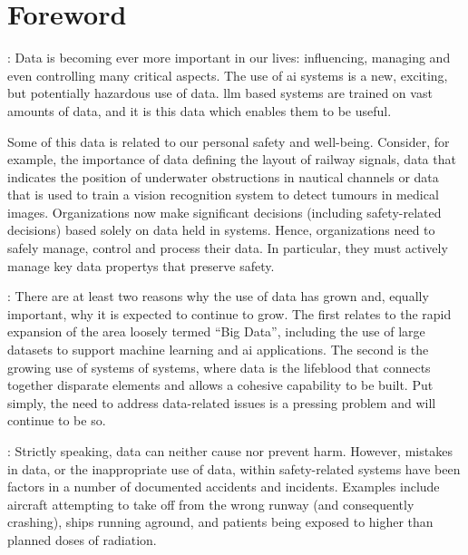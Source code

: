 \makeatletter		%
\dsiwg@intblankpage
\makeatother

\pagestyle{FirstPageFrontMatter}
\section*{Foreword}


:
Data is becoming ever more important in our lives: influencing, managing and even controlling many critical aspects.
The use of \gls{ai} systems is a new, exciting, but potentially hazardous use of data. \Gls{llm} based systems are trained on vast amounts of data, and it is this data which enables them to be useful.

Some of this data is related to our personal safety and well-being.
Consider, for example, the importance of data defining the layout of railway signals,
data that indicates the position of underwater obstructions in nautical channels or data that
is used to train a vision recognition system to detect tumours in medical images.
Organizations now make significant decisions (including safety-related decisions) based solely on data held in systems.
Hence, organizations need to safely manage, control and process their data.
In particular, they must actively manage key \glspl{data property} that preserve safety.

: There are at least two reasons why the use of data has grown and, equally important, why it is expected to continue to grow. The  first relates to the rapid expansion of the area loosely termed ``Big Data'', including the use of large \glspl{dataset} to support machine learning and \gls{ai} applications. The second is the growing use of systems of systems, where data is the lifeblood that connects together disparate elements and allows a cohesive capability to be built. Put simply, the need to address data-related issues is a pressing problem and will continue to be so.

: Strictly speaking,
data can neither cause nor prevent harm.
However, mistakes in data, or the inappropriate use of data, within safety-related systems have been factors in a number of documented accidents and incidents. Examples include aircraft attempting to take off from the wrong runway (and consequently crashing), ships running aground, and patients being exposed to higher than planned doses of radiation.

